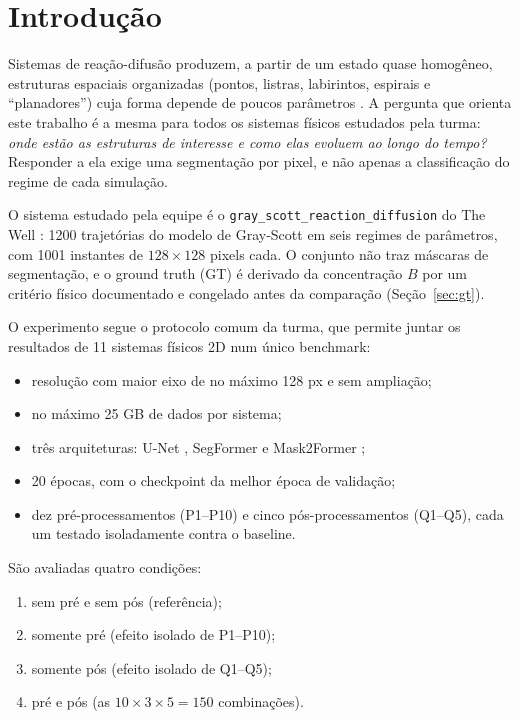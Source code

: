 \section{Introdução}
\label{sec:intro}

Sistemas de reação-difusão produzem, a partir de um estado quase homogêneo, estruturas espaciais
organizadas (pontos, listras, labirintos, espirais e ``planadores'') cuja forma depende de poucos
parâmetros \cite{turing1952,pearson1993}. A pergunta que orienta este trabalho é a mesma para
todos os sistemas físicos estudados pela turma: \emph{onde estão as estruturas de interesse e como
elas evoluem ao longo do tempo?} Responder a ela exige uma segmentação por pixel, e não apenas a
classificação do regime de cada simulação.

O sistema estudado pela equipe é o \texttt{gray\_scott\_reaction\_diffusion} do The Well
\cite{ohana2024well}: 1200 trajetórias do modelo de Gray-Scott \cite{grayscott1984,pearson1993}
em seis regimes de parâmetros, com 1001 instantes de $128\times128$ pixels cada. O conjunto não
traz máscaras de segmentação, e o ground truth (GT) é derivado da concentração $B$ por um critério
físico documentado e congelado antes da comparação (Seção~\ref{sec:gt}).

O experimento segue o protocolo comum da turma, que permite juntar os resultados de 11 sistemas
físicos 2D num único benchmark:
\begin{itemize}
  \item resolução com maior eixo de no máximo 128 px e sem ampliação;
  \item no máximo 25 GB de dados por sistema;
  \item três arquiteturas: U-Net \cite{ronneberger2015}, SegFormer \cite{xie2021segformer} e
    Mask2Former \cite{cheng2022mask2former};
  \item 20 épocas, com o checkpoint da melhor época de validação;
  \item dez pré-processamentos (P1--P10) e cinco pós-processamentos (Q1--Q5), cada um testado
    isoladamente contra o baseline.
\end{itemize}

São avaliadas quatro condições:
\begin{enumerate}
  \item sem pré e sem pós (referência);
  \item somente pré (efeito isolado de P1--P10);
  \item somente pós (efeito isolado de Q1--Q5);
  \item pré e pós (as $10\times3\times5 = 150$ combinações).
\end{enumerate}

